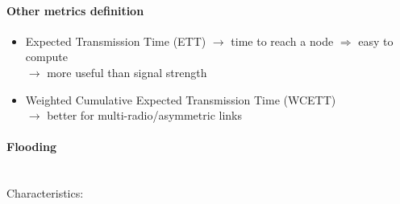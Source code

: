 \paragraph{Other metrics definition}
\begin{itemize}
    \item Expected Transmission Time (ETT) $\rightarrow$ time to reach a node
    $\Rightarrow$ easy to compute\\$\rightarrow$ more useful than signal strength
    \item Weighted Cumulative Expected Transmission Time (WCETT)\\
    $\rightarrow$ better for multi-radio/asymmetric links
\end{itemize}

\paragraph{Flooding}\mbox{}\\[0.2cm]
Characteristics:
